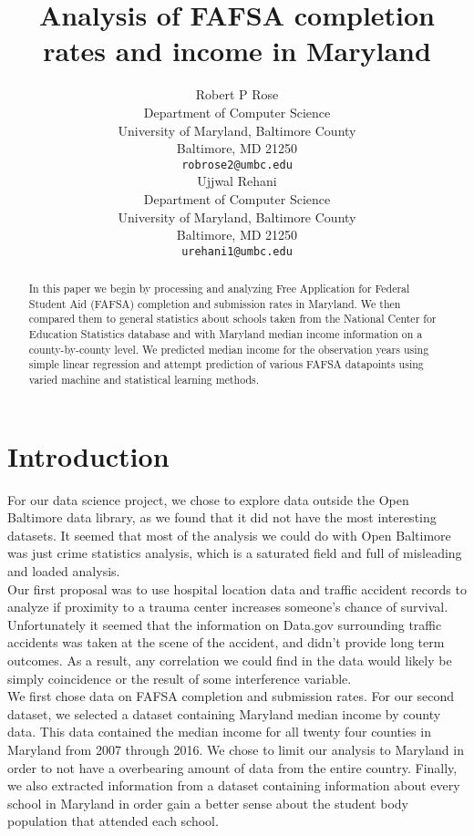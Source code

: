 \documentclass[12pt]{article}
\title{Analysis of FAFSA completion rates and income in Maryland}
\author{
  Robert P Rose \\
  Department of Computer Science\\
  University of Maryland, Baltimore County\\
  Baltimore, MD 21250 \\
  \texttt{robrose2@umbc.edu} \\
   \And
  Ujjwal Rehani \\
  Department of Computer Science\\
  University of Maryland, Baltimore County\\
  Baltimore, MD 21250 \\
  \texttt{urehani1@umbc.edu} \\
}
\begin{document}
\maketitle

\begin{abstract}
In this paper we begin by processing and analyzing Free Application for Federal
Student Aid (FAFSA) completion and submission rates in Maryland. We then compared them to 
general statistics about schools taken from the National Center for Education 
Statistics database and with Maryland median income information on a 
county-by-county level. We predicted median income for the observation years using 
simple linear regression and attempt prediction of various FAFSA datapoints using 
varied machine and statistical learning methods. \\
\end{abstract}

\section{Introduction}
For our data science project, we chose to explore data outside the Open Baltimore
data library, as we found that it did not have the most interesting datasets. It
seemed that most of the analysis we could do with Open Baltimore was just crime
statistics analysis, which is a saturated field and full of misleading and 
loaded analysis.\cite{weatherburn2011} \\

Our first proposal was to use hospital location data and traffic accident records
to analyze if proximity to a trauma center increases someone's chance of survival.
Unfortunately it seemed that the information on Data.gov surrounding traffic
accidents was taken at the scene of the accident, and didn't provide long term
outcomes. As a result, any correlation we could find in the data would likely be
simply coincidence or the result of some interference variable. \\

We first chose data on FAFSA completion and submission rates. For our second 
dataset, we selected a dataset containing Maryland median income by county data.
This data contained the median income for all twenty four counties in Maryland 
from 2007 through 2016. We chose to limit our analysis to Maryland in order to 
not have a overbearing amount of data from the entire country. Finally, we also 
extracted information from a dataset containing information about every school 
in Maryland in order gain a better sense about the student body population that 
attended each school. \\
\end{document}

